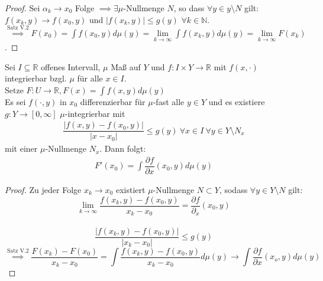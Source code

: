   \begin{proof}
    Sei $\alpha_k \to x_0$ Folge $\implies \exists \mu$-Nullmenge $N$, so dass $\forall y\in y\setminus N$ gilt: \\
    $f(x_k,y) \to f(x_0,y)$ und $|f(x_k,y)| \leq g(y)$ $\forall k\in\mathbb{N}$. \\
    $\overset{\text{Satz V.2}}{\implies} F(x_0) = \int f(x_0,y) d\mu(y) = \lim\limits_{k\to\infty} \int f(x_k,y) d\mu(y) = \lim\limits_{k\to\infty} F(x_k)$.
  \end{proof}


  \begin{theorem}
    Sei $I \subseteq \mathbb{R}$ offenes Intervall, $\mu$ Maß auf $Y$ und $f: I \times Y \to \mathbb{R}$ mit $f(x, \cdot)$ integrierbar bzgl. $\mu$ für alle $x \in I$.\\
    Setze $F: U \to \mathbb{R}, F(x) = \int f(x,y) d\mu(y)$\\
    Es sei $f(\cdot, y)$ in $x_0$ differenzierbar für $\mu$-fast alle $y \in Y$ und es existiere $g: Y \to [0, \infty]$ $\mu$-integrierbar mit
    \begin{align*}
      \dfrac{|f(x,y) - f(x_0, y)|}{|x-x_0|} \leq g(y) \ \forall x\in I \ \forall y \in Y \setminus N_x
    \end{align*} 
    mit einer $\mu$-Nullmenge $N_x$. Dann folgt:
    \begin{align*}
      F'(x_0) = \int \dfrac{\partial f}{\partial x} (x_0, y) d\mu(y)
    \end{align*}
  \end{theorem}
  \begin{proof}
    Zu jeder Folge $x_k \to x_0$ existiert $\mu$-Nullmenge $N\subset Y$, sodass $\forall y\in Y\setminus N$ gilt: \\
    $$\lim\limits_{k\to\infty} \frac{f(x_k,y)-f(x_0,y)}{x_k-x_0} = \frac{\partial f}{\partial_x}(x_0,y)$$ \\
    $$\frac{|f(x_k,y)-f(x_0,y)|}{|x_k-x_0|} \leq g(y)$$ 
    $$\overset{\text{Satz V.2}}{\implies} \frac{F(x_k)-F(x_0)}{x_k-x_0} = \int \frac{f(x_k,y)-f(x_0,y)}{x_k-x_0} d\mu(y) \to \int \frac{\partial f}{\partial x}(x_o,y) d\mu(y)$$
  \end{proof}

  \newpage

